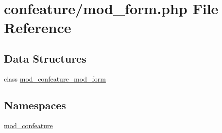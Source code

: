 \hypertarget{mod__form_8php}{\section{confeature/mod\-\_\-form.php File Reference}
\label{mod__form_8php}
}
\subsection*{Data Structures}
\begin{DoxyCompactItemize}
\item 
class \hyperlink{classmod__confeature__mod__form}{mod\-\_\-confeature\-\_\-mod\-\_\-form}
\end{DoxyCompactItemize}
\subsection*{Namespaces}
\begin{DoxyCompactItemize}
\item 
\hyperlink{namespacemod__confeature}{mod\-\_\-confeature}
\end{DoxyCompactItemize}
